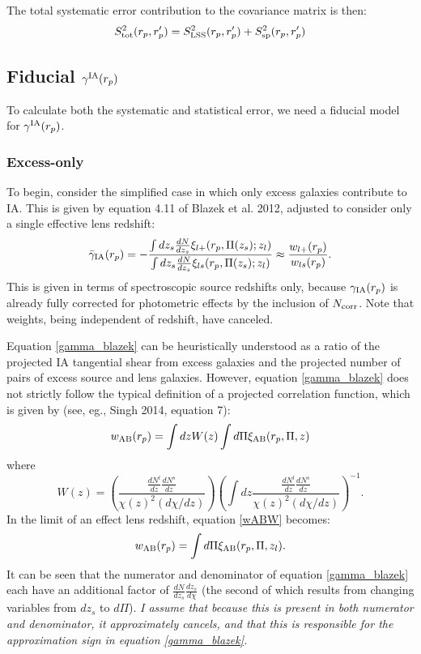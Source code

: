 \documentclass[onecolumn,amsmath,aps,fleqn, superscriptaddress]{revtex4}
\begin{document}
The total systematic error contribution to the covariance matrix is then:
\begin{equation}
S_{\rm tot}^2(r_p, r_p^\prime) = S_{\rm LSS}^2(r_p, r_p^\prime) + S_{\rm sp}^2(r_p, r_p^\prime) 
\label{sysall}
\end{equation}

\subsection{Fiducial $\gamma^{\rm IA}(r_p)$}
To calculate both the systematic and statistical error, we need a fiducial model for $\gamma^{\rm IA}(r_p)$.

\subsubsection*{Excess-only}
To begin, consider the simplified case in which only excess galaxies contribute to IA. This is given by equation 4.11 of Blazek et al. 2012, adjusted to consider only a single effective lens redshift:
\begin{equation}
\bar{\gamma}_{\rm IA}(r_p) = -\frac{\int dz_s \frac{dN}{dz_s} \xi_{l+}(r_p, \Pi(z_s); z_l)}{\int dz_s \frac{dN}{dz_s} \xi_{ls}(r_p, \Pi(z_s); z_l)} \approx \frac{w_{l+}(r_p)}{w_{ls}(r_p)}.
\label{gamma_blazek}
\end{equation}
This is given in terms of spectroscopic source redshifts only, because $\gamma_{\rm IA}(r_p)$ is already fully corrected for photometric effects by the inclusion of $N_{\rm corr}$. Note that weights, being independent of redshift, have canceled. 

Equation \ref{gamma_blazek} can be heuristically understood as a ratio of the projected IA tangential shear from excess galaxies and the projected number of pairs of excess source and lens galaxies. However, equation \ref{gamma_blazek} does not strictly follow the typical definition of a projected correlation function, which is given by (see, eg., Singh 2014, equation 7):
\begin{equation}
w_{\rm AB}(r_p) = \int dz W(z) \int d\Pi \xi_{\rm AB}(r_p, \Pi, z)
\label{wABW}
\end{equation}
where 
\begin{equation}
W(z) = \left(\frac{\frac{dN^l}{dz}\frac{dN^s}{dz}}{\chi(z)^2 (d\chi/dz)}\right) \left(\int dz \frac{\frac{dN^l}{dz}\frac{dN^s}{dz}}{\chi(z)^2 (d\chi/dz)}\right)^{-1}.
\label{wz}
\end{equation}
In the limit of an effect lens redshift, equation \ref{wABW} becomes:
\begin{equation}
w_{\rm AB}(r_p) = \int d\Pi \xi_{\rm AB}(r_p, \Pi, z_l).
\label{wAB}
\end{equation}
It can be seen that the numerator and denominator of equation \ref{gamma_blazek} each have an additional factor of $\frac{dN}{dz_s}\frac{dz_s}{d\chi}$ (the second of which results from changing variables from $dz_s$ to $d\Pi$). {\it I assume that because this is present in both numerator and denominator, it approximately cancels, and that this is responsible for the approximation sign in equation \ref{gamma_blazek}.} 
\end{document}
